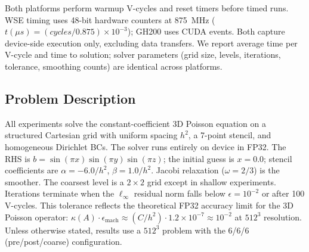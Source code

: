 \documentclass[conference]{IEEEtran}
\begin{document}
            Both platforms perform warmup V-cycles and reset timers before timed runs. WSE timing uses 48-bit hardware counters at 875~MHz ($t(\mu s){=}(cycles/0.875){\times}10^{-3}$); GH200 uses CUDA events. Both capture device-side execution only, excluding data transfers. We report average time per V-cycle and time to solution; solver parameters (grid size, levels, iterations, tolerance, smoothing counts) are identical across platforms.

        \subsection{Problem Description}
            All experiments solve the constant-coefficient 3D Poisson equation on a structured Cartesian grid with uniform spacing $h^2$, a 7-point stencil, and homogeneous Dirichlet BCs. The solver runs entirely on device in FP32. The RHS is $b{=}\sin(\pi x)\sin(\pi y)\sin(\pi z)$; the initial guess is $x{=}0.0$; stencil coefficients are $\alpha{=}{-}6.0/h^{2}$, $\beta{=}1.0/h^{2}$. Jacobi relaxation ($\omega{=}2/3$) is the smoother. The coarsest level is a $2{\times}2$ grid except in shallow experiments. Iterations terminate when the $\ell_\infty$ residual norm falls below $\epsilon{=}10^{-2}$ or after 100 V-cycles. This tolerance reflects the theoretical FP32 accuracy limit for the 3D Poisson operator: $\kappa(A)\cdot\epsilon_{\text{mach}} \approx (C/h^{2})\cdot 1.2{\times}10^{-7} \approx 10^{-2}$ at $512^3$ resolution. Unless otherwise stated, results use a $512^3$ problem with the 6/6/6 (pre/post/coarse) configuration.
\end{document}
